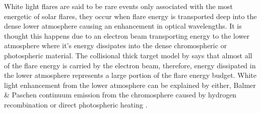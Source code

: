 White light flares are said to be rare events only associated with the most energetic of solar flares, they occur when flare energy is transported deep into the dense lower atmosphere causing an enhancement in optical wavelengths. It is thought this happens due to an electron beam transporting energy to the lower atmosphere where it's energy dissipates into the dense chromospheric or photospheric material. The collisional thick target model by \cite{1971SoPh...18..489B} says that almost all of the flare energy is carried by the electron beam, therefore, energy dissipated in the lower atmosphere represents a large portion of the flare energy budget. White light enhancement from the lower atmosphere can be explained by either, Balmer \& Paschen continuum emission from the chromosphere caused by hydrogen recombination or direct photospheric heating \citep{2007ASPC..368..417D}.

